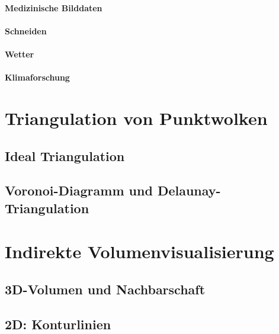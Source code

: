 \documentclass[a4paper, 11pt, accentcolor = tud3b]{tudreport}
\begin{document}
			\paragraph{Medizinische Bilddaten} %

			\paragraph{Schneiden} %

			\paragraph{Wetter} %

			\paragraph{Klimaforschung} %

		\section{Triangulation von Punktwolken} %

			\subsection{Ideal Triangulation} %

			\subsection{Voronoi-Diagramm und Delaunay-Triangulation} %

		\section{Indirekte Volumenvisualisierung} %

			\subsection{3D-Volumen und Nachbarschaft} %

			\subsection{2D: Konturlinien} %
\end{document}
